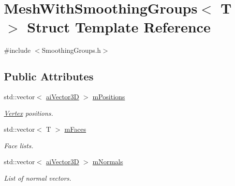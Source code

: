 \hypertarget{struct_mesh_with_smoothing_groups}{\section{Mesh\+With\+Smoothing\+Groups$<$ T $>$ Struct Template Reference}
\label{struct_mesh_with_smoothing_groups}
}


{\ttfamily \#include $<$Smoothing\+Groups.\+h$>$}

\subsection*{Public Attributes}
\begin{DoxyCompactItemize}
\item 
\hypertarget{struct_mesh_with_smoothing_groups_a06bfcf700c819e3a14e3bc1df88b729e}{std\+::vector$<$ \hyperlink{structai_vector3_d}{ai\+Vector3\+D} $>$ \hyperlink{struct_mesh_with_smoothing_groups_a06bfcf700c819e3a14e3bc1df88b729e}{m\+Positions}}\label{struct_mesh_with_smoothing_groups_a06bfcf700c819e3a14e3bc1df88b729e}

\begin{DoxyCompactList}\small\item\em \hyperlink{struct_vertex}{Vertex} positions. \end{DoxyCompactList}\item 
\hypertarget{struct_mesh_with_smoothing_groups_aa85873c9e454c314e05f0dc6f4bf22e9}{std\+::vector$<$ T $>$ \hyperlink{struct_mesh_with_smoothing_groups_aa85873c9e454c314e05f0dc6f4bf22e9}{m\+Faces}}\label{struct_mesh_with_smoothing_groups_aa85873c9e454c314e05f0dc6f4bf22e9}

\begin{DoxyCompactList}\small\item\em Face lists. \end{DoxyCompactList}\item 
\hypertarget{struct_mesh_with_smoothing_groups_a3ea96b42a7cf37d64dfa38307018ecdc}{std\+::vector$<$ \hyperlink{structai_vector3_d}{ai\+Vector3\+D} $>$ \hyperlink{struct_mesh_with_smoothing_groups_a3ea96b42a7cf37d64dfa38307018ecdc}{m\+Normals}}\label{struct_mesh_with_smoothing_groups_a3ea96b42a7cf37d64dfa38307018ecdc}

\begin{DoxyCompactList}\small\item\em List of normal vectors. \end{DoxyCompactList}\end{DoxyCompactItemize}


